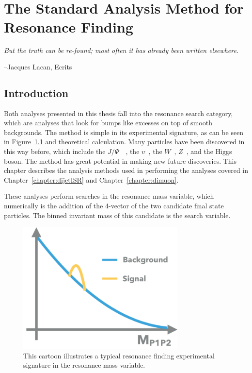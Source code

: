 \chapter{The Standard Analysis Method for Resonance Finding}
\label{chapter:analysismethod}

\epigraph{\textit{But the truth can be re-found; most often it has already been written elsewhere.}}{--Jacques Lacan, Ecrits}


\section{Introduction}
Both analyses presented in this thesis fall into the resonance search category, which are analyses that look for bumps like excesses on top of smooth backgrounds. The method is simple in its experimental signature, as can be seen in Figure~\ref{fig:bump} and theoretical calculation. Many particles have been discovered in this way before, which include the $J/\Psi$~\cite{PhysRevLett.33.1406}~\cite{PhysRevLett.33.1404}, the $\upsilon$~\cite{Herb:1977ek}, the $W$~\cite{Arnison:142059}, $Z$~\cite{hollik1984composite}, and the Higgs boson. The method has great potential in making new future discoveries. This chapter describes
the analysis methods used in performing the analyses covered in Chapter~\ref{chapter:dijetISR} and Chapter~\ref{chapter:dimuon}. 

These analyses perform searches in the resonance mass variable, which numerically is the addition of the 4-vector of the two candidate final state particles. The binned invariant mass of this candidate is the search variable.

\begin{figure}[!htb]
    \begin{center}
        \includegraphics[width=0.75\textwidth]{figures/chapter_analysismethod/resonance}
        \caption{
            This cartoon illustrates a typical resonance finding experimental signature in the resonance mass variable. 
        }
        \label{fig:bump}
    \end{center}
\end{figure}
\FloatBarrier

